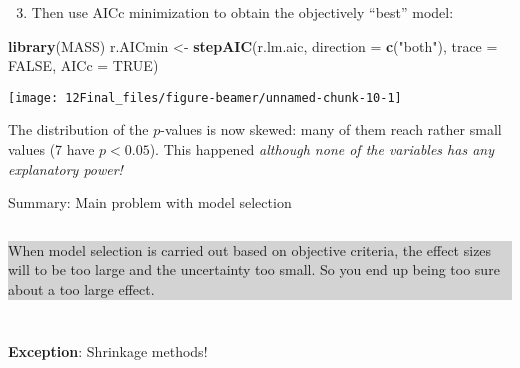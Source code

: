 \documentclass[10pt,ignorenonframetext,]{beamer}
\newenvironment{Shaded}{\begin{snugshade}}{\end{snugshade}}
\newcommand{\DataTypeTok}[1]{\textcolor[rgb]{0.13,0.29,0.53}{#1}}
\newcommand{\DecValTok}[1]{\textcolor[rgb]{0.00,0.00,0.81}{#1}}
\newcommand{\KeywordTok}[1]{\textcolor[rgb]{0.13,0.29,0.53}{\textbf{#1}}}
\newcommand{\NormalTok}[1]{#1}
\newcommand{\OperatorTok}[1]{\textcolor[rgb]{0.81,0.36,0.00}{\textbf{#1}}}
\newcommand{\OtherTok}[1]{\textcolor[rgb]{0.56,0.35,0.01}{#1}}
\newcommand{\StringTok}[1]{\textcolor[rgb]{0.31,0.60,0.02}{#1}}
\providecommand{\tightlist}{%
  \setlength{\itemsep}{0pt}\setlength{\parskip}{0pt}}
\begin{document}
\begin{frame}[fragile]

\begin{enumerate}
\setcounter{enumi}{2}
\tightlist
\item
  Then use AICc minimization to obtain the objectively ``best'' model:
\end{enumerate}

\vspace{2mm}

\scriptsize

\begin{Shaded}
\begin{Highlighting}[]
\KeywordTok{library}\NormalTok{(MASS)}
\NormalTok{r.AICmin <-}\StringTok{ }\KeywordTok{stepAIC}\NormalTok{(r.lm.aic, }\DataTypeTok{direction =} \KeywordTok{c}\NormalTok{(}\StringTok{"both"}\NormalTok{), }\DataTypeTok{trace =} \OtherTok{FALSE}\NormalTok{, }\DataTypeTok{AICc =} \OtherTok{TRUE}\NormalTok{)}
\end{Highlighting}
\end{Shaded}

\centering

\begin{Shaded}
\end{Shaded}

\texttt{[image: 12Final\_files/figure-beamer/unnamed-chunk-10-1]}

\flushleft
\normalsize

The distribution of the \(p\)-values is now skewed: many of them reach
rather small values (7 have \(p<0.05\)). This happened \emph{although
none of the variables has any explanatory power!}

\end{frame}

\begin{frame}

\begin{block}{Summary: Main problem with model selection}

\(~\)

\colorbox{lightgray}{\begin{minipage}{10cm}
When model selection is carried out based on objective criteria, the effect sizes will to be too large and the uncertainty too small. So you end up being too sure about a too large effect. 
\end{minipage}}

\(~\)

\(~\)

\textbf{Exception}: Shrinkage methods!

\end{block}

\end{frame}
\end{document}
